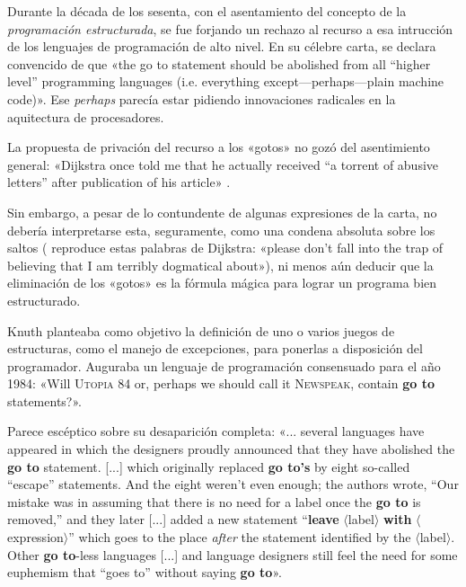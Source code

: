 \documentclass{tfg_domingo}
\begin{document}

Durante la década de los sesenta, con el asentamiento del
concepto de la \emph{programación estructurada}, se fue
forjando un rechazo al recurso a esa intrucción de los
lenguajes de programación de alto nivel. En su célebre
carta, \citet{1968_Dijkstra} se declara convencido de que
«the go to statement should be abolished from all
  “higher level” programming languages (i.e. everything
  except—perhaps—plain machine code)». Ese \emph{perhaps}
parecía estar pidiendo innovaciones radicales en la
aquitectura de procesadores.

La propuesta de privación del recurso a los «gotos» no gozó
del asentimiento general: «Dijkstra once told me that he
actually received “a torrent of abusive letters” after
publication of his article» \citep[p. 265]{1974_Knuth}.

Sin embargo, a pesar de lo contundente de algunas
expresiones de la carta, no debería interpretarse esta,
seguramente, como una condena absoluta sobre los saltos
(\citet{1974_Knuth} reproduce estas palabras de Dijkstra:
«please don’t fall into the trap of believing that I am
terribly dogmatical about»), ni menos aún deducir que la
eliminación de los «gotos» es la fórmula mágica para lograr
un programa bien estructurado.

Knuth planteaba como objetivo la definición de uno o varios
juegos de estructuras, como el manejo de excepciones, para
ponerlas a disposición del programador. Auguraba un lenguaje
de programación consensuado para el año 1984: «Will
\textsc{Utopia 84} or, perhaps we should call it
\textsc{Newspeak}, contain {\bf go to} statements?».

Parece escéptico sobre su desaparición completa:
«... several languages have appeared in which the designers
proudly announced that they have abolished the \textbf{go
  to} statement. [...] which originally replaced \textbf{go
  to’s} by eight so-called “escape” statements. And the
eight weren’t even enough; the authors wrote, “Our mistake
was in assuming that there is no need for a label once the
\textbf{go to} is removed,” and they later [...] added a new
statement “\textbf{leave} $\langle$label$\rangle$
\textbf{with} $\langle$expression$\rangle$” which goes to
the place \emph{after} the statement identified by the
$\langle$label$\rangle$. Other \textbf{go to}-less languages
[...] and language designers still feel the need for some
euphemism that “goes to” without saying \textbf{go to}».
\end{document}
